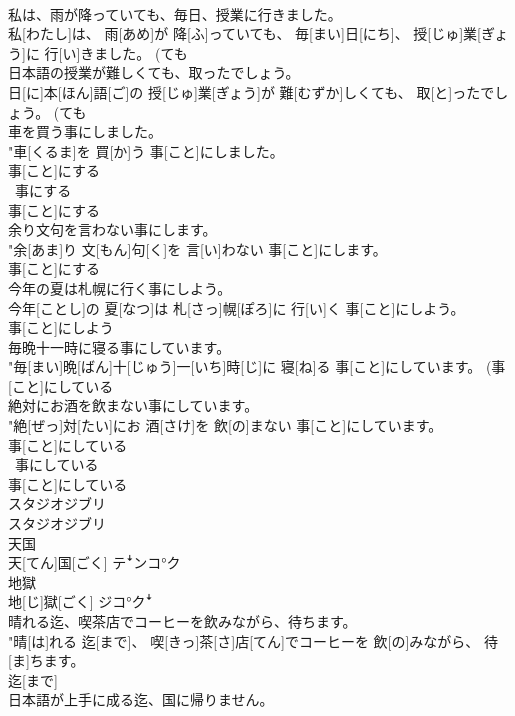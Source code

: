 \documentclass[8pt]{extreport}
\begin{document}
\begin{CJK}{UTF8}{min}
\\	私は、雨が降っていても、毎日、授業に行きました。	
\\	私[わたし]は、 雨[あめ]が 降[ふ]っていても、 毎[まい]日[にち]、 授[じゅ]業[ぎょう]に 行[い]きました。 (ても 
\\	日本語の授業が難しくても、取ったでしょう。	
\\	日[に]本[ほん]語[ご]の 授[じゅ]業[ぎょう]が 難[むずか]しくても、 取[と]ったでしょう。 (ても 
\\	車を買う事にしました。	
\\	"車[くるま]を 買[か]う 事[こと]にしました。 
\\	事[こと]にする 
\\	~事にする	
\\	事[こと]にする
\\	余り文句を言わない事にします。	
\\	"余[あま]り 文[もん]句[く]を 言[い]わない 事[こと]にします。 
\\	事[こと]にする 
\\	今年の夏は札幌に行く事にしよう。	
\\	今年[ことし]の 夏[なつ]は 札[さっ]幌[ぽろ]に 行[い]く 事[こと]にしよう。 
\\	事[こと]にしよう 
\\	毎晩十一時に寝る事にしています。	
\\	"毎[まい]晩[ばん]十[じゅう]一[いち]時[じ]に 寝[ね]る 事[こと]にしています。 (事[こと]にしている 
\\	絶対にお酒を飲まない事にしています。	
\\	"絶[ぜっ]対[たい]にお 酒[さけ]を 飲[の]まない 事[こと]にしています。 
\\	事[こと]にしている 
\\	~事にしている	
\\	事[こと]にしている
\\	スタジオジブリ	
\\	スタジオジブリ	
\\	天国	
\\	天[てん]国[ごく]	テꜜンコ°ク
\\	地獄	
\\	地[じ]獄[ごく]	ジコ°クꜜ
\\	晴れる迄、喫茶店でコーヒーを飲みながら、待ちます。	
\\	"晴[は]れる 迄[まで]、 喫[きっ]茶[さ]店[てん]でコーヒーを 飲[の]みながら、 待[ま]ちます。 
\\	迄[まで]
\\	日本語が上手に成る迄、国に帰りません。	

\end{CJK}
\end{document}
